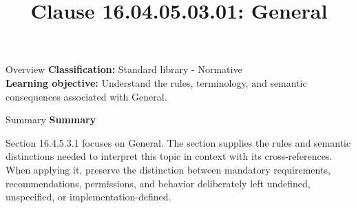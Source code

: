 \documentclass[10pt,letterpaper]{article}
\title{Clause 16.04.05.03.01: General}
\author{}
\date{}
\begin{document}
\maketitle
\begin{CornellOverviewBox}{Overview}
\textbf{Classification:} Standard library - Normative\\[2pt]
\textbf{Learning objective:} Understand the rules, terminology, and semantic consequences associated with General.
\end{CornellOverviewBox}\begin{CornellSummaryBox}{Summary}
{\sffamily\bfseries\color{Accent} Summary}\par\vspace{3pt}Section 16.4.5.3.1 focuses on General. The section supplies the rules and semantic distinctions needed to interpret this topic in context with its cross-references. When applying it, preserve the distinction between mandatory requirements, recommendations, permissions, and behavior deliberately left undefined, unspecified, or implementation-defined.
\end{CornellSummaryBox}
\end{document}
